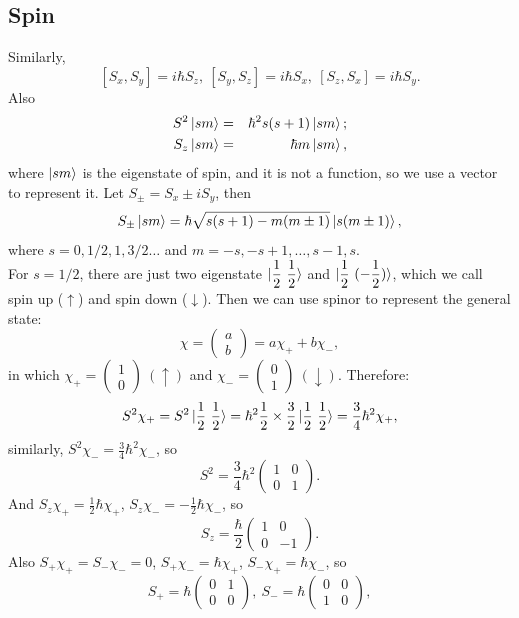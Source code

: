 \documentclass[12pt, 
]{article}
\begin{document}
\subsection{Spin}
Similarly, \[
	[S_x,S_y]=i\hbar S_z,~[S_y,S_z]=i\hbar S_x,~[S_z,S_x]=i\hbar S_y.
\]
Also
\begin{eqnarray*}
	S^2\ket{sm}&=&\hbar^2s(s+1)\ket{sm};\\
	S_z\ket{sm}&=&\hbar m\ket{sm},
\end{eqnarray*}
where $\ket{sm}$ is the eigenstate of spin, and it is not a function, so we use a vector to represent it.
Let $S_\pm=S_x\pm iS_y$, then
\begin{equation}
	S_\pm\ket{sm}=\hbar\sqrt{s(s+1)-m(m\pm1)}\ket{s(m\pm1)},
\end{equation}
where $s=0,1/2,1,3/2\dots$ and $m=-s, -s+1,\dots,s-1,s$.\\
For $s=1/2$, there are just two eigenstate $\displaystyle\ket{\frac{1}{2}~\frac{1}{2}}$ and $\displaystyle\ket{\frac{1}{2}~(-\frac{1}{2})}$, which we call spin up ($\uparrow$) and spin down ($\downarrow$). Then we can use spinor to represent the general state:
\[
	\chi= \begin{pmatrix}
		a\\b
	\end{pmatrix}=a\chi_++b\chi_{-}
,\]
in which $\chi_+= \begin{pmatrix}
	1\\0
\end{pmatrix}~(\uparrow)$ and $\chi_{-}= \begin{pmatrix}
	0\\1
\end{pmatrix}~(\downarrow)$. Therefore:
\[
	S^2\chi_+=S^2\ket{\frac{1}{2}~\frac{1}{2}}=\hbar^2\frac{1}{2}\times\frac{3}{2}\ket{\frac{1}{2}~\frac{1}{2}}=\frac{3}{4}\hbar^2\chi_+
,\]
similarly, $S^2\chi_{-}=\frac{3}{4}\hbar^2\chi_{-}$, so
\[
	S^2=\frac{3}{4}\hbar^2 \begin{pmatrix}
		1&0\\0&1
	\end{pmatrix}.
\]
And $S_z\chi_+=\frac{1}{2}\hbar\chi_+$, $S_z\chi_{-}=-\frac{1}{2}\hbar\chi_{-}$, so
\[
	S_z=\frac{\hbar}{2} \begin{pmatrix}
		1&0\\0&-1
	\end{pmatrix}.
\]
Also $S_+\chi_+=S_{-}\chi_{-}=0$, $S_+\chi_{-}=\hbar\chi_+$, $S_{-}\chi_+=\hbar\chi_{-}$, so
\[
	S_+=\hbar \begin{pmatrix}
		 0&1\\0&0
	\end{pmatrix},~S_{-}=\hbar \begin{pmatrix}
		0&0\\1&0
	\end{pmatrix},
\]
\end{document}
